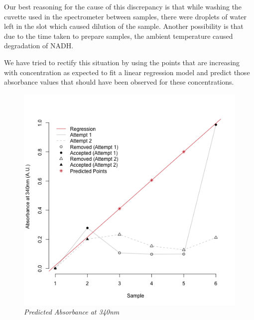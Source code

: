 \documentclass[a4paper,10pt]{article}
\begin{document}
            Our best reasoning for the cause of this discrepancy is that while washing the cuvette
            used in the spectrometer between samples, there were droplets of water left in the 
            slot which caused dilution of the sample.
            Another possibility is that due to the time taken to prepare samples, the ambient 
            temperature caused degradation of NADH.

            We have tried to rectify this situation by using the points that are increasing with
            concentration as expected to fit a linear regression model and predict those absorbance
            values that should have been observed for these concentrations.

            \begin{minipage}{0.49\textwidth}
                \begin{figure}[H]
                    \centering
                    \caption{\it Predicted Absorbance at 340nm}\label{fig:abs_340_pred}
                    \includegraphics[width=\textwidth]{../resources/absorption_340_pred.png}
                \end{figure}
            \end{minipage}
            \hspace{0.01\textwidth}
\end{document}
